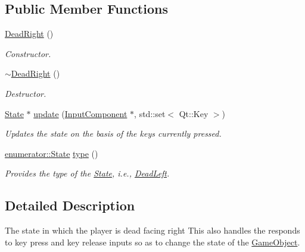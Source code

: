 \subsection*{Public Member Functions}
\begin{DoxyCompactItemize}
\item 
\hypertarget{classDeadRight_a08aa0bda5faa79706498c10bf7f7ab57}{\hyperlink{classDeadRight_a08aa0bda5faa79706498c10bf7f7ab57}{Dead\-Right} ()}\label{classDeadRight_a08aa0bda5faa79706498c10bf7f7ab57}

\begin{DoxyCompactList}\small\item\em Constructor. \end{DoxyCompactList}\item 
\hypertarget{classDeadRight_a04979ad62939563bb7e995f967536b87}{\hyperlink{classDeadRight_a04979ad62939563bb7e995f967536b87}{$\sim$\-Dead\-Right} ()}\label{classDeadRight_a04979ad62939563bb7e995f967536b87}

\begin{DoxyCompactList}\small\item\em Destructor. \end{DoxyCompactList}\item 
\hyperlink{classState}{State} $\ast$ \hyperlink{classDeadRight_a90bbfab63b08a87dd2b36bbdb8830aa5}{update} (\hyperlink{classInputComponent}{Input\-Component} $\ast$, std\-::set$<$ Qt\-::\-Key $>$)
\begin{DoxyCompactList}\small\item\em Updates the state on the basis of the keys currently pressed. \end{DoxyCompactList}\item 
\hyperlink{namespaceenumerator_a5fc7b342c2c633e1037b07cea237a222}{enumerator\-::\-State} \hyperlink{classDeadRight_abd8e52205ddafd19858a81f25cd87106}{type} ()
\begin{DoxyCompactList}\small\item\em Provides the type of the \hyperlink{classState}{State}, i.\-e., \hyperlink{classDeadLeft}{Dead\-Left}. \end{DoxyCompactList}\end{DoxyCompactItemize}


\subsection{Detailed Description}
The state in which the player is dead facing right This also handles the responds to key press and key release inputs so as to change the state of the \hyperlink{classGameObject}{Game\-Object}. 

